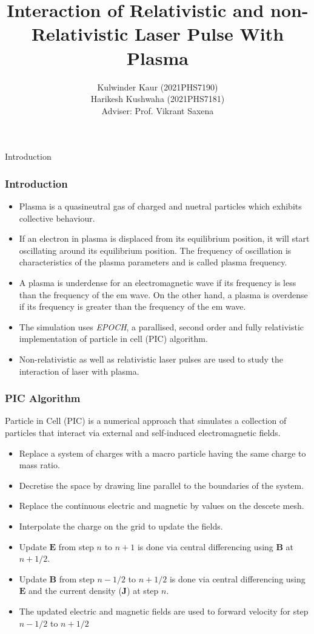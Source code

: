 \documentclass{beamer}
\title[Interaction of Laser with Plasma]{Interaction of Relativistic and non-Relativistic Laser Pulse With Plasma}
\date{}
\institute[IIT Delhi]{\large Indian Institute of Technology, Delhi}
\author[]{Kulwinder Kaur (2021PHS7190)\\ Harikesh Kushwaha (2021PHS7181)\\[3mm]Adviser: Prof. Vikrant Saxena}
\begin{document}
\maketitle
\begin{frame}{Introduction}
    \frametitle{Introduction}
    \small
    \begin{itemize}
        \item Plasma is a quasineutral gas of charged and nuetral particles which exhibits collective behaviour.
        \item If an electron in plasma is displaced from its equilibrium position, it will start oscillating around its equilibrium position. The frequency of oscillation is characteristics of the plasma parameters and is called plasma frequency.
        \item A plasma is underdense for an electromagnetic wave if its frequency is less than the frequency of the em wave. On the other hand, a plasma is overdense if its frequency is greater than the frequency of the em wave.
        \item The simulation uses \textit{EPOCH}, a parallised, second order and fully relativistic implementation of particle in cell
              (PIC) algorithm.
        \item Non-relativistic as well as relativistic laser pulses are used to study the interaction of laser with plasma.
    \end{itemize}
\end{frame}
\begin{frame}
    \small
    \frametitle{PIC Algorithm}
    Particle in Cell (PIC) is a numerical approach that simulates a collection of particles that interact via external and self-induced electromagnetic fields.
    \begin{itemize}
        \item Replace a system of charges with a macro particle having the same charge to mass ratio.
        \item Decretise the space by drawing line parallel to the boundaries of the system.
        \item Replace the continuous electric and magnetic by values on the descete mesh.
        \item Interpolate the charge on the grid to update the fields.
        \item Update $\mathbf{E}$ from step $n$ to $n+1$ is done via central differencing using $\mathbf{B}$ at $n+1/2$.
        \item Update $\mathbf{B}$ from step $n-1/2$ to $n+1/2$ is done via central differencing using $\mathbf{E}$ and the current density ($\textbf{J}$) at step $n$.
        \item The updated electric and magnetic fields are used to forward velocity for step $n-1/2$ to $n+1/2$
    \end{itemize}
\end{frame}
\end{document}

